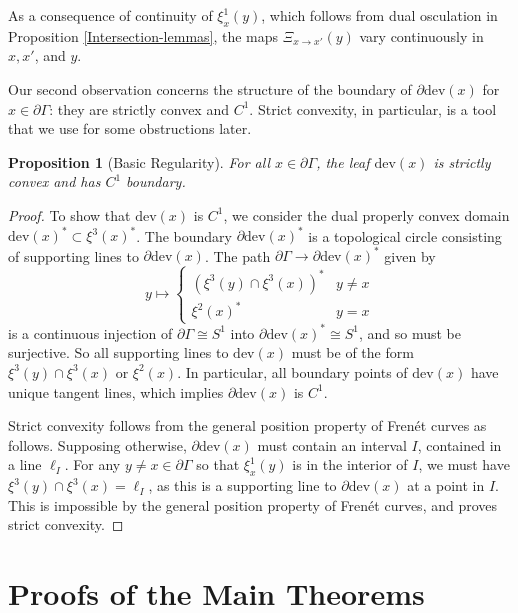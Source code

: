 \documentclass[12pt,a4paper]{amsart}
\theoremstyle{definition}
\theoremstyle{plain}
\newtheorem{proposition}[theorem]{Proposition}
\numberwithin{equation}{section}
\begin{document}
As a consequence of continuity of $\xi^1_{x}(y)$, which follows from dual osculation in Proposition \ref{Intersection-lemmas}, the maps $\Xi_{x \to x'}(y)$ vary continuously in $x,x'$, and $y$.

Our second observation concerns the structure of the boundary of $\partial \text{dev}(x)$ for $x \in \partial \Gamma$: they are strictly convex and $C^1$. Strict convexity, in particular, is a tool that we use for some obstructions later.

\begin{proposition}[Basic Regularity]
     For all $x \in \partial \Gamma$, the leaf {\rm{$\text{dev}(x)$}} is strictly convex and has $C^1$ boundary.
\end{proposition}

\begin{proof}
To show that $\text{dev}(x)$ is $C^1$, we consider the dual properly convex domain $\text{dev}(x)^* \subset \xi^3(x)^*$. The boundary $\partial \text{dev}(x)^*$ is a topological circle consisting of supporting lines to $\partial \text{dev}(x)$. The path $\partial \Gamma \to \partial \text{dev}(x)^*$ given by $$y \mapsto \begin{cases} (\xi^3(y) \cap \xi^3(x))^* & y \neq x \\ \xi^2(x)^* & y = x 
\end{cases}$$ is a continuous injection of $\partial \Gamma \cong S^1$ into $\partial \text{dev}(x)^* \cong S^1$, and so must be surjective. So all supporting lines to $\text{dev}(x)$ must be of the form $\xi^3(y) \cap \xi^3(x)$ or $\xi^2(x)$. In particular, all boundary points of $\text{dev}(x)$ have unique tangent lines, which implies $\partial \text{dev}(x)$ is $C^1$.

Strict convexity follows from the general position property of Fren\'et curves as follows. Supposing otherwise, $\partial \text{dev}(x)$ must contain an interval $I$, contained in a line $\ell_I$. For any $y \neq x \in\partial \Gamma$ so that $\xi_x^1(y)$ is in the interior of $I$, we must have $\xi^3(y) \cap \xi^3(x) = \ell_I$, as this is a supporting line to $\partial \text{dev}(x)$ at a point in $I$. This is impossible by the general position property of Fren\'et curves, and proves strict convexity.
\end{proof}

\section{Proofs of the Main Theorems}\label{section-proof-of-main-theorem}
\end{document}
